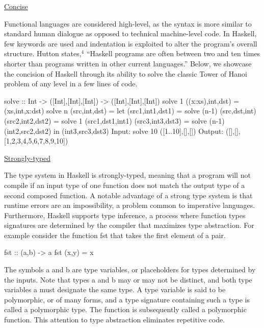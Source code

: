 \documentclass[11pt]{article}
\begin{document}
\hspace{0.5cm}\underline{Concise}

Functional languages are considered high-level, as the syntax is more similar to standard human dialogue as opposed to technical machine-level code. In Haskell, few keywords are used and indentation is exploited to alter the program's overall structure. Hutton states,$^4$ ``Haskell programs are often between two and ten times shorter than programs written in other current languages.'' Below, we showcase the concision of Haskell through its ability to solve the classic Tower of Hanoi problem of any level in a few lines of code. 

\hspace{0.2cm}\begin{verbbox}
solve :: Int -> ([Int],[Int],[Int]) -> ([Int],[Int],[Int])
solve 1 ((x:xs),int,dst) = (xs,int,x:dst)
solve n (src,int,dst) = let (src1,int1,dst1) = solve (n-1) (src,dst,int)
                            (src2,int2,dst2) = solve 1 (src1,dst1,int1)
                            (src3,int3,dst3) = solve (n-1) (int2,src2,dst2)
                        in (int3,src3,dst3)
Input:   solve 10 ([1..10],[],[]) 
Output: ([],[],[1,2,3,4,5,6,7,8,9,10])
\end{verbbox}
\theverbbox

\hspace{0.5cm}\underline{Strongly-typed}

The type system in Haskell is strongly-typed, meaning that a program will not compile if an input type of one function does not match the output type of a second composed function. A notable advantage of a strong type system is that runtime errors are an impossibility, a problem common to imperative languages. Furthermore, Haskell supports type inference, a process where function types signatures are determined by the compiler that maximizes type abstraction. For example consider the function fst that takes the first element of a pair. 

\hspace{2cm}\begin{verbbox}
fst :: (a,b) -> a
fst (x,y) = x
\end{verbbox}
\theverbbox

The symbols a and b are type variables, or placeholders for types determined by the inputs. Note that types a and b may or may not be distinct, and both type variables a must designate the same type. A type variable is said to be polymorphic, or of many forms, and a type signature containing such a type is called a polymorphic type. The function is subsequently called a polymorphic function. This attention to type abstraction eliminates repetitive code.                                                                                       
\end{document}
